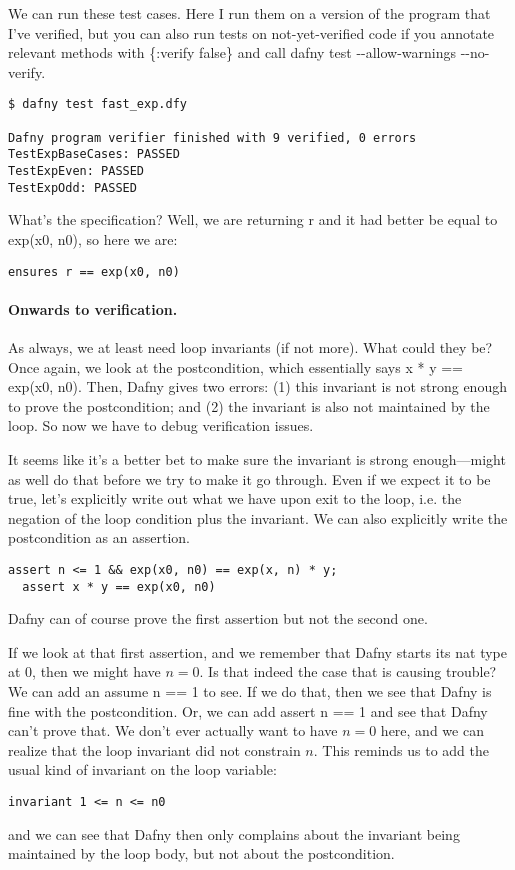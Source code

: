 \documentclass[11pt]{article}
\begin{document}
We can run these test cases. Here I run them on a version of the program that I've verified, but
you can also run tests on not-yet-verified code if you annotate relevant methods with
\textsf{\{:verify false\}} and call \textsf{dafny test -{}-allow-warnings -{}-no-verify}.
\begin{verbatim}
$ dafny test fast_exp.dfy

Dafny program verifier finished with 9 verified, 0 errors
TestExpBaseCases: PASSED
TestExpEven: PASSED
TestExpOdd: PASSED
\end{verbatim}

What's the specification? Well, we are returning \textsf{r} and it had better be equal to
\textsf{exp(x0, n0)}, so here we are:
\begin{lstlisting}[language=dafny]
  ensures r == exp(x0, n0)
\end{lstlisting}

\paragraph{Onwards to verification.}
As always, we at least need loop invariants (if not more). What could they be?
Once again, we look at the postcondition, which essentially says
\textsf{x * y == exp(x0, n0)}. Then, Dafny gives two errors: (1) this invariant
is not strong enough to prove the postcondition; and (2) the invariant is also
not maintained by the loop. So now we have to debug verification issues.

It seems like it's a better bet to make sure the invariant is strong enough---might as
well do that before we try to make it go through. Even if we expect it to be true,
let's explicitly write out what we have upon exit to the loop, i.e. the negation of the
loop condition plus the invariant. We can also explicitly write the postcondition as an assertion.
\begin{lstlisting}[language=dafny]
  assert n <= 1 && exp(x0, n0) == exp(x, n) * y;
  assert x * y == exp(x0, n0)
\end{lstlisting}
Dafny can of course prove the first assertion but not the second one.

If we look at that first assertion, and we remember that Dafny starts its \textsf{nat}
type at 0, then we might have $n = 0$. Is that indeed the case that is causing trouble?
We can add an \textsf{assume n == 1} to see. If we do that, then we see that Dafny is fine
with the postcondition. Or, we can add \textsf{assert n == 1} and see that Dafny can't prove that.
We don't ever actually want to have $n = 0$ here, and we can realize that
the loop invariant did not constrain $n$. This reminds us to add the usual kind of invariant
on the loop variable:
\begin{lstlisting}[language=dafny]
  invariant 1 <= n <= n0
\end{lstlisting}
and we can see that Dafny then only complains about the invariant being maintained by the loop body,
but not about the postcondition.
\end{document}
